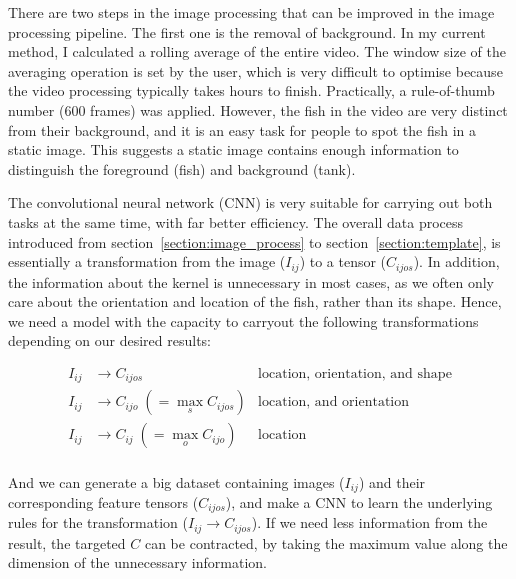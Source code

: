 \documentclass[11pt,twoside]{report}
\begin{document}
There are two steps in the image processing that can be improved in the image processing pipeline. The first one is the removal of background. In my current method, I calculated a rolling average of the entire video. The window size of the averaging operation is set by the user, which is very difficult to optimise because the video processing typically takes hours to finish. Practically, a rule-of-thumb number (600 frames) was applied. However, the fish in the video are very distinct from their background, and it is an easy task for people to spot the fish in a static image. This suggests a static image contains enough information to distinguish the foreground (fish) and background (tank). 

The convolutional neural network (\gls{CNN}) is very suitable for carrying out both tasks at the same time, with far better efficiency. The overall data process introduced from section~\ref{section:image_process} to section~\ref{section:template}, is essentially a transformation from the image ($I_{ij}$) to a tensor ($C_{ijos}$). In addition, the information about the kernel is unnecessary in most cases, as we often only care about the orientation and location of the fish, rather than its shape. Hence, we need a model with the capacity to carryout the following transformations depending on our desired results:

$$
\begin{aligned}
I_{ij} &\rightarrow C_{ijos} 
&\textrm{location, orientation, and shape} \\[1ex]
I_{ij} &\rightarrow C_{ijo}\;(= \max_{s}{C_{ijos}})
&\textrm{location, and orientation} \\
I_{ij} &\rightarrow C_{ij}\;(= \max_{o}{C_{ijo}})
& \textrm{location} \\
\end{aligned}
$$

\noindent And we can generate a big dataset containing images ($I_{ij}$) and their corresponding feature tensors ($C_{ijos}$), and make a CNN to learn the underlying rules for the transformation ($I_{ij} \rightarrow C_{ijos}$). If we need less information from the result, the targeted $C$ can be contracted, by taking the maximum value along the dimension of the unnecessary information.
\end{document}
